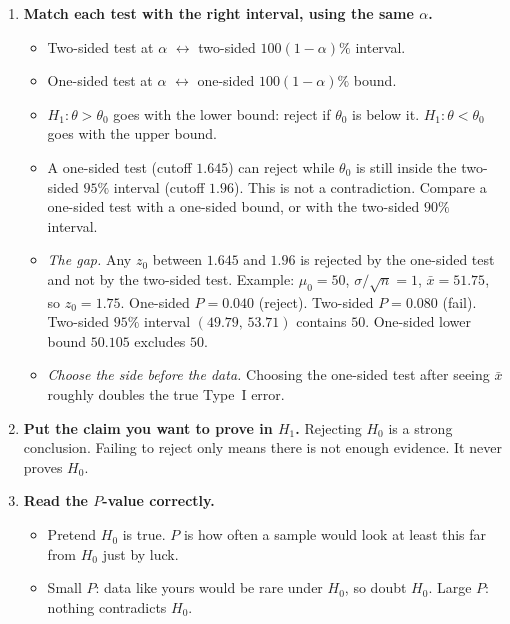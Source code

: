 \begin{enumerate}
\begin{itemize}
    \item \emph{Numerical check} (impact-energy data: $\bar{x}=64.46$, standard error $0.316$). Two-sided $95\%$: $(63.84,\,65.08)$. One-sided $95\%$: $\mu\le64.98$ or $\mu\ge63.94$. Two-sided $90\%$: $(63.94,\,64.98)$, which equals the two one-sided $95\%$ bounds. One-sided $97.5\%$ upper bound: $65.08$.
  \end{itemize}
  \item \textbf{Match each test with the right interval, using the same $\alpha$.}
  \begin{itemize}
    \item Two-sided test at $\alpha$ $\leftrightarrow$ two-sided $100(1-\alpha)\%$ interval.
    \item One-sided test at $\alpha$ $\leftrightarrow$ one-sided $100(1-\alpha)\%$ bound.
    \item $H_1:\theta>\theta_0$ goes with the lower bound: reject if $\theta_0$ is below it. $H_1:\theta<\theta_0$ goes with the upper bound.
    \item A one-sided test (cutoff $1.645$) can reject while $\theta_0$ is still inside the two-sided $95\%$ interval (cutoff $1.96$). This is not a contradiction. Compare a one-sided test with a one-sided bound, or with the two-sided $90\%$ interval.
    \item \emph{The gap.} Any $z_0$ between $1.645$ and $1.96$ is rejected by the one-sided test and not by the two-sided test. Example: $\mu_0=50$, $\sigma/\sqrt n=1$, $\bar{x}=51.75$, so $z_0=1.75$. One-sided $P=0.040$ (reject). Two-sided $P=0.080$ (fail). Two-sided $95\%$ interval $(49.79,\,53.71)$ contains $50$. One-sided lower bound $50.105$ excludes $50$.
    \item \emph{Choose the side before the data.} Choosing the one-sided test after seeing $\bar{x}$ roughly doubles the true Type~I error.
  \end{itemize}
  \item \textbf{Put the claim you want to prove in $H_1$.} Rejecting $H_0$ is a strong conclusion. Failing to reject only means there is not enough evidence. It never proves $H_0$.
  \item \textbf{Read the $P$-value correctly.}
  \begin{itemize}
    \item Pretend $H_0$ is true. $P$ is how often a sample would look at least this far from $H_0$ just by luck.
    \item Small $P$: data like yours would be rare under $H_0$, so doubt $H_0$. Large $P$: nothing contradicts $H_0$.

\end{itemize}
\end{enumerate}
